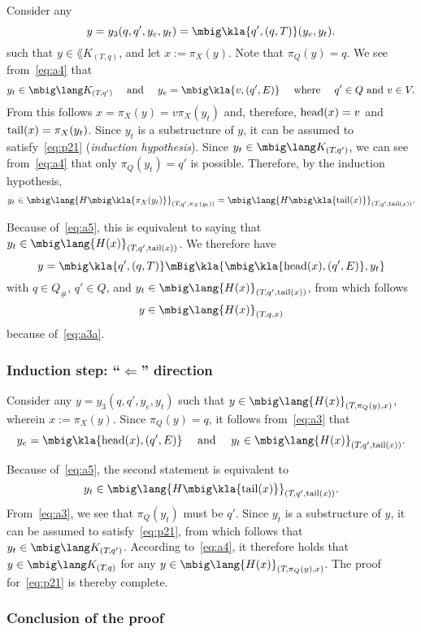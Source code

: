 Consider any
\[
 y = y_3(q,q',y_e,y_t) = \mbig\kla{q',(q,T)}(y_e,y_t).
\]
such that $y\in\lang K_{(T,q)}$, and let $x:=\pi_X(y)$. Note that $\pi_Q(y) =
q$.  We see from~\eqref{eq:a4} that
\[
 y_t \in \mbig\lang K_{(T\!,q')}
 \quad\text{ and }\quad
 y_e = \mbig\kla{v,(q',E)}
 \quad\text{ where }\quad
 q'\in Q \text{ and } v\in V.
\]
From this follows $x = \pi_X(y) = v\pi_X(y_t)$ and, therefore, $\operatorname{head}(x) = v$
and $\operatorname{tail}(x)=\pi_X(y_t)$. Since $y_t$ is a substructure of $y$, it can be
assumed to satisfy~\eqref{eq:p21} (\emph{induction hypothesis}). Since
$y_t\in\mbig\lang K_{(T\!,q')}$, we can see from~\eqref{eq:a4} that only
$\pi_Q(y_t) = q'$ is possible. Therefore, by the induction hypothesis,
\[
 y_t
 \in \mbig\lang{H\mbig\kla{\pi_X(y_t)}}_{(T\!,q',\pi_X(y_t))}
 = \mbig\lang{H\mbig\kla{\cdr(x)}}_{(T\!,q',\cdr(x))}.
\]

Because of~\eqref{eq:a5}, this is equivalent to saying that $y_t \in \mbig\lang{H(x)}_{(T\!,q',\cdr(x))}$. We therefore have
\[
 y = \mbig\kla{q',(q,T)}\mBig\kla{\mbig\kla{\car(x),(q',E)},y_t}
\]
with $q\in Q_\#$, $q'\in Q$, and $y_t \in \mbig\lang{H(x)}_{(T\!,q',\cdr(x))}$,
from which follows
\[
 y \in \mbig\lang{H(x)}_{(T\!,q,x)}
\]
because of~\eqref{eq:a3a}.

\subsubsection*{Induction step: ``$\Leftarrow$'' direction}

Consider any $y = y_3(q,q',y_e,y_t)$ such that
$y\in\mbig\lang{H(x)}_{(T\!,\pi_Q(y),x)}$, wherein $x := \pi_X(y)$. Since
$\pi_Q(y) = q$, it follows from~\eqref{eq:a3} that
\[
 y_e = \mbig\kla{\car(x),(q',E)}
 \quad\text{ and }\quad
 y_t \in \mbig\lang{H(x)}_{(T\!,q',\cdr(x))}.
\]

Because of~\eqref{eq:a5}, the second statement is equivalent to
\[
 y_t \in \mbig\lang{H\mbig\kla{\cdr(x)}}_{(T\!,q',\cdr(x))}.
\]
From~\eqref{eq:a3}, we see that $\pi_Q(y_t)$ must be $q'$. Since $y_t$ is a
substructure of $y$, it can be assumed to satisfy~\eqref{eq:p21}, from which
follows that $y_t \in \mbig\lang K_{(T\!,q')}$. According to~\eqref{eq:a4}, it
therefore holds that $y\in\mbig\lang K_{(T\!,q)}$ for any
$y\in\mbig\lang{H(x)}_{(T\!,\pi_Q(y),x)}$. The proof for~\eqref{eq:p21} is
thereby complete.

\subsubsection*{Conclusion of the proof}

